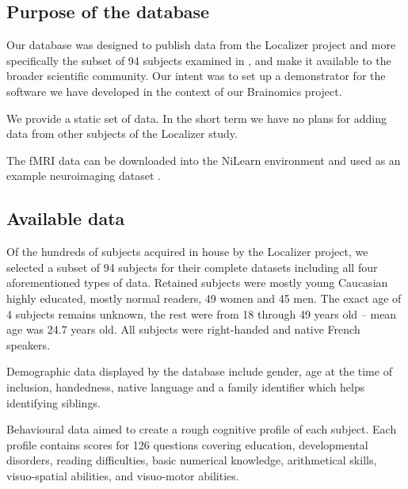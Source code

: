\documentclass[review]{elsarticle}
\begin{document}
\subsection{Purpose of the database}

Our database was designed to publish data from the Localizer project \cite{Pinel2007} and more specifically the subset of 94 subjects examined in \cite{Pinel2012}, and make it available to the broader scientific community. Our intent was to set up a demonstrator for the software we have developed in the context of our Brainomics project.

We provide a static set of data. In the short term we have no plans for adding data from other subjects of the Localizer study.

The fMRI data can be downloaded into the NiLearn environment and used as an example neuroimaging dataset \cite{NiLearn_Localizer}.


\subsection{Available data}

Of the hundreds of subjects acquired in house by the Localizer project, we selected a subset of 94 subjects for their complete datasets \cite{Pinel2012} including all four aforementioned types of data. Retained subjects were mostly young Caucasian highly educated, mostly normal readers, 49 women and 45 men. The exact age of 4 subjects remains unknown, the rest were from 18 through 49 years old -- mean age was 24.7 years old. All subjects were right-handed and native French speakers.

Demographic data displayed by the database include gender, age at the time of inclusion, handedness, native language and a family identifier which helps identifying siblings.

Behavioural data aimed to create a rough cognitive profile of each subject. Each profile contains scores for 126 questions covering education, developmental disorders, reading difficulties, basic numerical knowledge, arithmetical skills, visuo-spatial abilities, and visuo-motor abilities.
\end{document}
